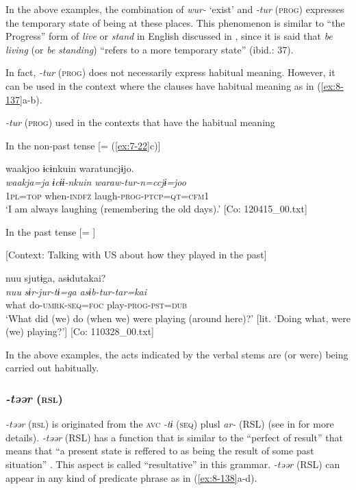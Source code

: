 In the above examples, the combination of \textit{wur-} ‘exist’ and \textit{-tur} (\textsc{prog}) expresses the temporary state of being at these places. This phenomenon is similar to “the Progress” form of \textit{live} or \textit{stand} in English discussed in \citet{Comrie1976}, since it is said that \textit{be} \textit{living} (or \textit{be} \textit{standing}) “refers to a more temporary state” (ibid.: 37).

  In fact, \textit{-tur} (\textsc{prog}) does not necessarily express habitual meaning. However, it can be used in the context where the clauses have habitual meaning as in (\ref{ex:8-137}a-b).

\ea\label{ex:8-137}
  \textit{-tur} (\textsc{prog}) used in the contexts that have the habitual meaning

\ea In the non-past tense [= (\ref{ex:7-22}c)]

{\TM}
\glll  waakjoo  ɨcɨnkuin  waratuncjɨjo.\\
\textit{waakja=ja}  \textit{ɨcɨɨ-nkuin}  \textit{waraw-tur-n=ccjɨ=joo}\\
1\textsc{pl}=\textsc{top}  when-\textsc{indfz}  laugh-\textsc{prog}-\textsc{ptcp}=\textsc{qt}=\textsc{cfm1}\\
\glt ‘I am always laughing (remembering the old days).’ [Co: 120415\_00.txt]

\ex In the past tense [= ]

    [Context: Talking with US about how they played in the past]

{\TM}
\glll  nuu  sjutɨga,  asɨdutakai?\\
\textit{nuu}  \textit{sɨr-jur-tɨ=ga}  \textit{asɨb-tur-tar=kai}\\
what  do-\textsc{umrk}-\textsc{seq}=\textsc{foc}  play-\textsc{prog}-\textsc{pst}=\textsc{dub}\\
\glt ‘What did (we) do (when we) were playing (around here)?’ [lit. ‘Doing what, were (we) playing?’]       [Co: 110328\_00.txt]
\z
\z

In the above examples, the acts indicated by the verbal stems are (or were) being carried out habitually.

\subsubsection{\textit{-təər} (\textsc{rsl})}

\textit{-təər} (\textsc{rsl}) is originated from the \textsc{avc} \textit{-tɨ} (\textsc{seq}) plusl \textit{ar-} (RSL) (see  in  for more details). \textit{-təər} (RSL) has a function that is similar to the “perfect of result” that means that “a present state is reffered to as being the result of some past situation” \citep[56]{Comrie1976}. This aspect is called “resultative” in this grammar. \textit{-təər} (RSL) can appear in any kind of predicate phrase as in (\ref{ex:8-138}a-d).

